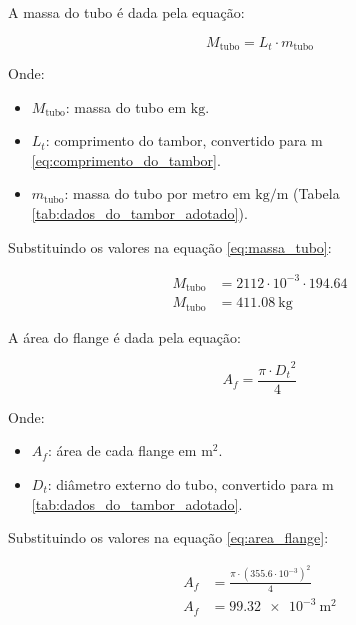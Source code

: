 A massa do tubo é dada pela equação:

\begin{equation}
  M_{\text{tubo}} = L_t \cdot m_{\text{tubo}}
  \label{eq:massa_tubo}
\end{equation}

Onde:

\begin{itemize}[leftmargin=1.25cm]
  \item $M_{\text{tubo}}$: massa do tubo em $\si{\kilo\gram}$.
  \item $L_t$: comprimento do tambor, convertido para $\si{\meter}$ \eqref{eq:comprimento_do_tambor}.
  \item $m_{\text{tubo}}$: massa do tubo por metro em $\si{\kilo\gram/\meter}$ (Tabela \ref{tab:dados_do_tambor_adotado}).
\end{itemize}

\vspace{1em}

Substituindo os valores na equação \eqref{eq:massa_tubo}:

\begin{align*}
  M_{\text{tubo}} & = 2112 \cdot 10^{-3} \cdot \num{194.64} \\
  M_{\text{tubo}} & = \boxed{\SI{411.08}{\kilo\gram}}
\end{align*}

A área do flange é dada pela equação:

\begin{equation}
  A_f = \frac{\pi \cdot {D_t}^2}{4}
  \label{eq:area_flange}
\end{equation}

Onde:

\begin{itemize}[leftmargin=1.25cm]
  \item $A_f$: área de cada flange em $\si{\meter^2}$.
  \item $D_t$: diâmetro externo do tubo, convertido para $\si{\meter}$ \ref{tab:dados_do_tambor_adotado}.
\end{itemize}

\vspace{1em}

Substituindo os valores na equação \eqref{eq:area_flange}:

\begin{align*}
  A_f & = \frac{\pi \cdot {\left(\num{355.6} \cdot 10^{-3}\right)}^2}{4} \\
  A_f & = \boxed{\SI{99.32e-3}{\meter^2}}
\end{align*}


